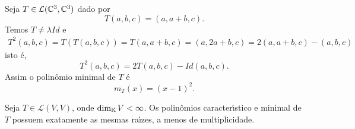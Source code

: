 \begin{exemplo}
	Seja $T \in \mathcal{L}(\mathbb{C}^3, \mathbb{C}^3)$ dado por
	\[
		T(a, b, c) = (a, a + b, c).
	\]
	Temos $T \ne \lambda Id$ e
	\begin{align*}
		T^2(a,b,c) = T(T(a,b,c)) = T(a,a+b,c) = (a,2a+b,c) = 2(a,a+b,c) - (a,b,c)
	\end{align*}
	isto \'e,
	\[
		T^2(a,b,c) = 2T(a,b,c) - Id(a,b,c).
	\]
	Assim o polin\^omio minimal de $T$ \'e
	\[
		m_T(x) = (x - 1)^2.
	\]
\end{exemplo}

\begin{teorema}
	Seja $T \in \mathcal{L}(V,V)$, onde $\dim_{\mathbb{K}} V < \infty$. Os polin\^omios caracter{\'\i}stico e minimal de $T$ possuem exatamente as mesmas ra{\'\i}zes, a menos de multiplicidade.
\end{teorema}

